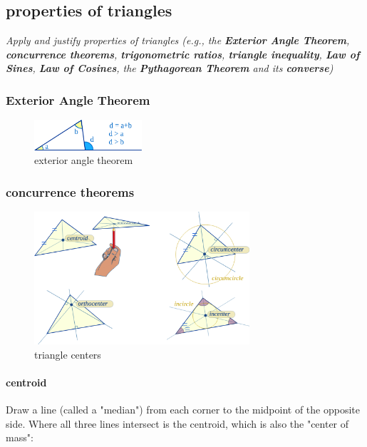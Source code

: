 \subsection{properties of triangles}

\textit{Apply and justify properties of triangles (e.g., the \textbf{Exterior Angle Theorem}, \textbf{concurrence theorems}, \textbf{trigonometric ratios}, \textbf{triangle inequality}, \textbf{Law of Sines}, \textbf{Law of Cosines}, the \textbf{Pythagorean Theorem} and its \textbf{converse})}

\subsubsection{Exterior Angle Theorem}

\begin{figure}[h!]
    \centering
    \includegraphics[width=4cm]{./public/images/exterior-angle-theorem}
    \caption[exterior-angle]{exterior angle theorem}
\end{figure}

\vspace{4cm}

\subsubsection{concurrence theorems}

\begin{figure}[h!]
    \centering
    \includegraphics[width=8cm]{./public/images/triangle-centers}
    \caption{triangle centers}
\end{figure}

\paragraph*{centroid} Draw a line (called a "median") from each corner to the midpoint of the opposite side.
Where all three lines intersect is the centroid, which is also the "center of mass":

